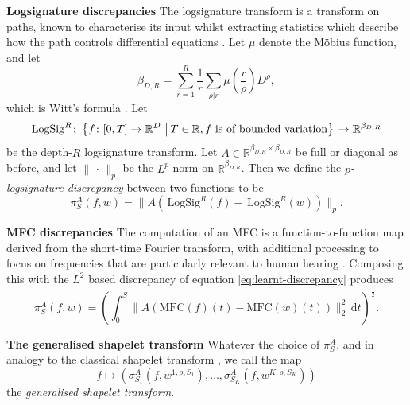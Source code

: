 \documentclass{article}
\theoremstyle{plain}
\theoremstyle{definition}
\newcommand{\set}[2]{\left\{#1\,\left\vert\,#2\vphantom{#1}\right\}\right.}
\newcommand{\reals}{\mathbb{R}}
\newcommand{\norm}[1]{\|#1\|}
\newcommand{\dee}{\,\mathrm{d}}
\newcommand{\logsig}{\mathrm{LogSig}}
\newcommand{\mfc}{\mathrm{MFC}}
\newcommand{\boldheading}[1]{

\textbf{#1}\quad}
\begin{document}
	\boldheading{Logsignature discrepancies}
	The logsignature transform is a transform on paths, known to characterise its input whilst extracting statistics which describe how the path controls differential equations \cite{logsig-rnn, levy-lyons, kidger2019deep, signatory, howisonutilisation}. Let $\mu$ denote the M{\"o}bius function, and let
	\begin{equation*}
	\beta_{D, R} = \sum_{r = 1}^R \frac{1}{r} \sum_{\rho \vert r} \mu\left(\frac{r}{\rho}\right) D^\rho,
	\end{equation*}
	which is Witt's formula \cite{witt}. Let
	\begin{equation*}
	\logsig^R \colon \set{f \colon [0, T] \to \reals^D}{T \in \reals, f\text{ is of bounded variation}} \to \reals^{\beta_{D, R}}
	\end{equation*}
	be the depth-$R$ logsignature transform. Let $A \in \reals^{\beta_{D, R} \times \beta_{D, R}}$ be full or diagonal as before, and let $\norm{\,\cdot\,}_p$ be the $L^p$ norm on $\reals^{\beta_{D, R}}$. Then we define the \emph{$p$-logsignature discrepancy} between two functions to be
	\begin{equation}\label{eq:logsignature-discrepancy}
	\pi^A_{S}(f, w) = \norm{A(\,\logsig^R(f) - \,\logsig^R(w))}_p.
	\end{equation}
	
	\boldheading{MFC discrepancies}
	The computation of an MFC is a function-to-function map derived from the short-time Fourier transform, with additional processing to focus on frequencies that are particularly relevant to human hearing \cite{mfc}. Composing this with the $L^2$ based discrepancy of equation \eqref{eq:learnt-discrepancy} produces
	\begin{equation}\label{eq:mfc-discrepancy}
	\pi^A_{S}(f, w) = (\int_{0}^{S} \norm{A(\mfc(f)(t) - \mfc(w)(t))}_2^2 \dee t)^{\frac{1}{2}}.
	\end{equation}
	
	\boldheading{The generalised shapelet transform}
	Whatever the choice of $\pi^A_S$, and in analogy to the classical shapelet transform \cite{hills2014classification}, we call the map
	\begin{equation}\label{eq:generalised-shapelet-transform}
	f \mapsto (\sigma^A_{S_1}(f, w^{1, \rho, S_1}), \ldots, \sigma^A_{S_K}(f, w^{K, \rho, S_K}))
	\end{equation}
	the \emph{generalised shapelet transform}.
	
\end{document}
